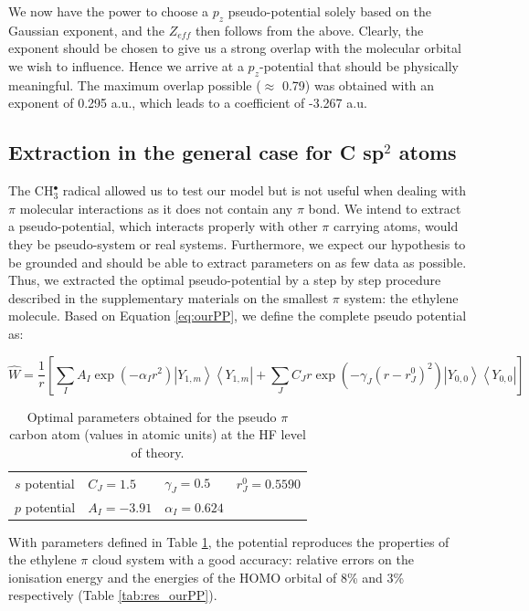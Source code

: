 \documentclass[aip]{revtex4-1}
\begin{document}
We now have the power to choose a \(p_{z}\) pseudo-potential solely based on the Gaussian
exponent, and the \(Z_{eff}\) then follows from the above.
Clearly, the exponent should be chosen to give us a strong overlap with the molecular
orbital we wish to influence.
Hence we arrive at a \(p_{z}\)-potential that should be physically meaningful.
The maximum overlap possible ($\approx$ 0.79) was obtained with an exponent
of 0.295 a.u., which leads to a coefficient of -3.267 a.u.

\subsection{Extraction in the general case for C sp$^2$ atoms}
\label{section:csp2_extraction}
The CH$_3^\bullet$ radical allowed us to test our model but is not useful
when dealing with $\pi$ molecular interactions as it does not contain
any $\pi$ bond.
We intend to extract a pseudo-potential, which interacts properly with 
other $\pi$ carrying atoms, would they be pseudo-system or real systems.
Furthermore, we expect our hypothesis to be grounded and should be able to
extract parameters on as few data as possible.
Thus, we extracted the optimal pseudo-potential by a step by step procedure described in 
the supplementary materials on the smallest $\pi$ system: the ethylene molecule.
Based on Equation \ref{eq:ourPP}, we define the complete pseudo potential as:

\begin{equation}
\label{eq:ourPPwithparams}
\hat{W} = \frac{1}{r}\left[%
\sum_IA_I\exp(-\alpha_I r^2)\left|Y_{1,m}\right>\left<Y_{1,m}\right|+
\sum_JC_Jr\exp(-\gamma_J (r-r^0_J)^2)\left|Y_{0,0}\right>\left<Y_{0,0}\right|
\right]
\end{equation}

\begin{table}[ht]
\begin{tabular}{llll}
\hline\hline
$s$ potential & $C_J=1.5$ & $\gamma_J=0.5$   & $r^0_J=0.5590$\\
$p$ potential & $A_I=-3.91$ & $\alpha_I=0.624$ &  \\
\hline
\hline
\end{tabular}
\caption{\label{tab:params}Optimal parameters obtained for the pseudo 
$\pi$ carbon atom (values in atomic units) at the HF level of theory.}
\end{table}

With parameters defined in Table \ref{tab:params}, the potential reproduces the properties of the ethylene $\pi$ cloud system with a good accuracy: relative errors on the ionisation energy and the energies of the HOMO orbital of 8\% and 3\% respectively (Table \ref{tab:res_ourPP}).
\end{document}
